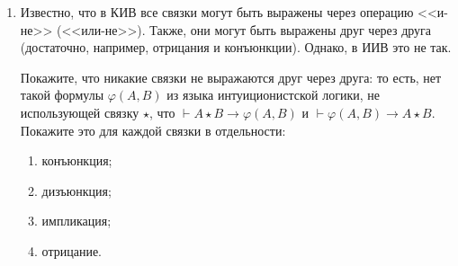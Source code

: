 \documentclass[10pt,a4paper,oneside]{article}
\begin{document}
\begin{enumerate}
Очевидно, что любая интуиционистская тавтология общезначима и в классической логике:
\begin{itemize}
\item формула общезначима в интуиционистской логике; 
\item значит, истинна при всех оценках; 
\item значит, в частности, при всех оценках на $\mathbb{R}$;
\item то есть, по теореме, упомянутой выше, доказуема в ИИВ;
\item а схема аксиом 10и --- частный случай схемы аксиом 10.
\end{itemize}
Обратное же неверно. Определите, являются ли следующие формулы тавтологиями в КИВ и ИИВ (предложите опровержение или доказательство 
общезначимости/выводимости для каждого из исчислений). В качестве доказательств формул приводите их натуральный вывод.

\begin{enumerate}
\item $((A \rightarrow B) \rightarrow A) \rightarrow A$;
\item $\neg\neg A \rightarrow A$;
\item $(A \rightarrow B) \vee (B \rightarrow A)$ 
(из двух утверждений одно непременно следует из другого: например, <<я не люблю зиму>> и <<я не люблю лето>>);
\item $(A \rightarrow B) \vee (B \rightarrow C)$;
\item $(A \rightarrow (B \vee \neg B)) \vee (\neg A \rightarrow (B \vee \neg B))$;
\item $\alpha\vee\beta \vdash \neg(\neg\alpha\with\neg\beta)$ и $\neg(\neg\alpha\with\neg\beta) \vdash \alpha\vee\beta$;
\item $\neg\alpha\with\neg\beta \vdash \neg(\alpha\vee\beta)$ и $\neg(\alpha\vee\beta) \vdash \neg\alpha\with\neg\beta$;
\item $\alpha\rightarrow\beta \vdash \neg\alpha\vee\beta$ и $\neg\alpha\vee\beta \vdash \alpha\rightarrow\beta$.
\end{enumerate}

\item Известно, что в КИВ все связки могут быть выражены через операцию <<и-не>> (<<или-не>>). Также, они могут быть выражены друг через
друга (достаточно, например, отрицания и конъюнкции). Однако, в ИИВ это не так.

Покажите, что никакие связки не выражаются друг через друга: то есть, нет такой формулы $\varphi(A,B)$ из языка 
интуиционистской логики, не использующей связку $\star$, что $\vdash A \star B \rightarrow \varphi(A,B)$ и $\vdash\varphi(A,B) \rightarrow A \star B$.
Покажите это для каждой связки в отдельности:
\begin{enumerate}
\item конъюнкция;
\item дизъюнкция;
\item импликация;
\item отрицание.
\end{enumerate}

\end{enumerate}
\end{document}
